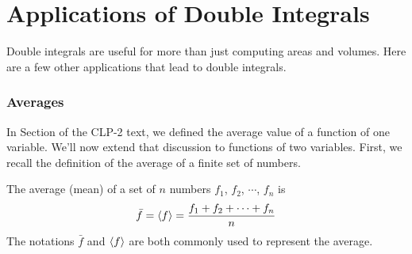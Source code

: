 \goodbreak
\section{Applications of Double Integrals}
\label{sec int 2d applications}

Double integrals are useful for more than just computing
areas and volumes. Here are a few other applications that
lead to double integrals. 

\subsubsection{Averages}

In Section  of the CLP-2 text, we defined
the average value of a function of one variable. We'll now extend that
discussion to functions of two variables. First, we recall the
definition of the average of a finite set of numbers.

\begin{defn}\label{def avg}
 The average (mean) of a set of $n$ numbers $f_1$, $f_2$, $\cdots$, $f_n$ is
\begin{align*}
\bar f = \left< f\right> =\frac{f_1+f_2+\cdots+f_n}{n}
\end{align*}
The notations $\bar f$ and $\left< f\right>$ are both commonly used
to represent the average.
\end{defn}

